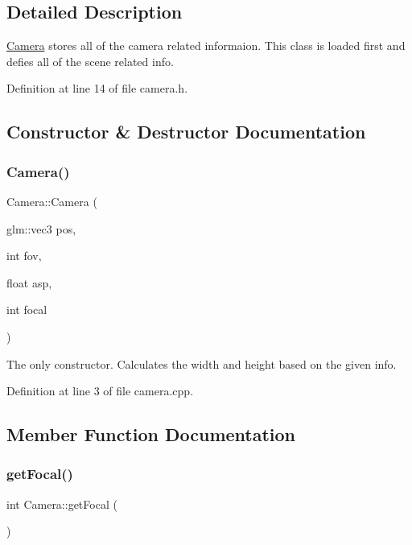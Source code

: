 \subsection{Detailed Description}
\mbox{\hyperlink{class_camera}{Camera}} stores all of the camera related informaion. This class is loaded first and defies all of the scene related info. 

Definition at line 14 of file camera.\+h.



\subsection{Constructor \& Destructor Documentation}
\mbox{\label{class_camera_a650299ece1e549c512df12164a5a0e9a}} 
\subsubsection{\texorpdfstring{Camera()}{Camera()}}
{\footnotesize\ttfamily Camera\+::\+Camera (\begin{DoxyParamCaption}\item[{glm\+::vec3}]{pos,  }\item[{int}]{fov,  }\item[{float}]{asp,  }\item[{int}]{focal }\end{DoxyParamCaption})}



The only constructor. Calculates the width and height based on the given info. 



Definition at line 3 of file camera.\+cpp.



\subsection{Member Function Documentation}
\mbox{\label{class_camera_a5045b4557d3cd7cd4c64c49f5a693aa5}} 
\subsubsection{\texorpdfstring{get\+Focal()}{getFocal()}}
{\footnotesize\ttfamily int Camera\+::get\+Focal (\begin{DoxyParamCaption}{ }\end{DoxyParamCaption})\hspace{0.3cm}{\ttfamily [inline]}}



